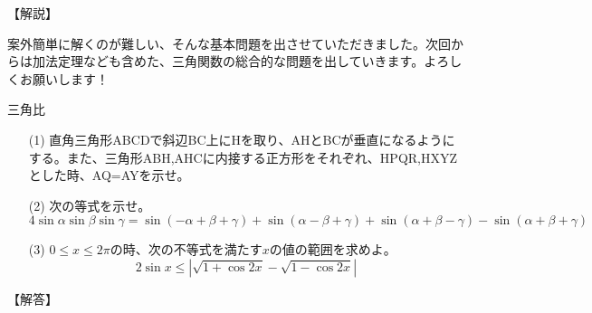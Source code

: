 \documentclass[a4paper,fleqn,dvipdfmx]{jsarticle}
\begin{document}
\begin{flushleft}
【解説】
\end{flushleft}

案外簡単に解くのが難しい、そんな基本問題を出させていただきました。次回からは加法定理なども含めた、三角関数の総合的な問題を出していきます。よろしくお願いします！



\newpage

\begin{itembox}[l]{三角比}
\begin{itemize}
    \item [(1)] 直角三角形ABCDで斜辺BC上にHを取り、AHとBCが垂直になるようにする。また、三角形ABH,AHCに内接する正方形をそれぞれ、HPQR,HXYZとした時、AQ=AYを示せ。
    \item [(2)] 次の等式を示せ。$$4\sin\alpha\sin\beta\sin\gamma=\sin(-\alpha+\beta+\gamma)+\sin(\alpha-\beta+\gamma)+\sin(\alpha+\beta-\gamma)-\sin(\alpha+\beta+\gamma)$$
    \item [(3)] $0\leq x \leq 2\pi$の時、次の不等式を満たす$x$の値の範囲を求めよ。
    $$2\sin x \leq |\sqrt{1+\cos 2x}-\sqrt{1-\cos 2x}|$$
\end{itemize}
\end{itembox}


\begin{flushleft}
【解答】
\end{flushleft}
\end{document}
